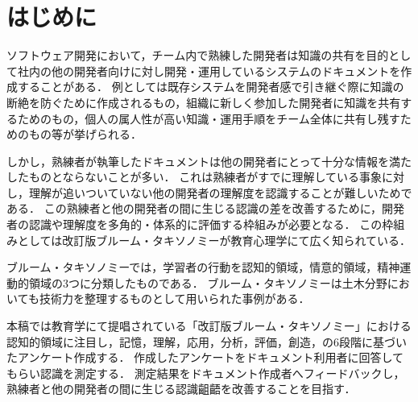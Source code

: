 \section{はじめに}
ソフトウェア開発において，チーム内で熟練した開発者は知識の共有を目的として社内の他の開発者向けに対し開発・運用しているシステムのドキュメントを作成することがある．
例としては既存システムを開発者感で引き継ぐ際に知識の断絶を防ぐために作成されるもの，組織に新しく参加した開発者に知識を共有するためのもの，個人の属人性が高い知識・運用手順をチーム全体に共有し残すためのもの等が挙げられる．

しかし，熟練者が執筆したドキュメントは他の開発者にとって十分な情報を満たしたものとならないことが多い．
これは熟練者がすでに理解している事象に対し，理解が追いついていない他の開発者の理解度を認識することが難しいためである．
この熟練者と他の開発者の間に生じる認識の差を改善するために，開発者の認識や理解度を多角的・体系的に評価する枠組みが必要となる．
この枠組みとしては改訂版ブルーム・タキソノミーが教育心理学にて広く知られている\cite{bib:nakao}．

ブルーム・タキソノミーでは，学習者の行動を認知的領域，情意的領域，精神運動的領域の3つに分類したものである．
ブルーム・タキソノミーは土木分野においても技術力を整理するものとして用いられた事例がある．\cite{bib:miyahara}

本稿では教育学にて提唱されている「改訂版ブルーム・タキソノミー」における認知的領域に注目し，記憶，理解，応用，分析，評価，創造，の6段階に基づいたアンケート作成する．
作成したアンケートをドキュメント利用者に回答してもらい認識を測定する．
測定結果をドキュメント作成者へフィードバックし，熟練者と他の開発者の間に生じる認識齟齬を改善することを目指す．



